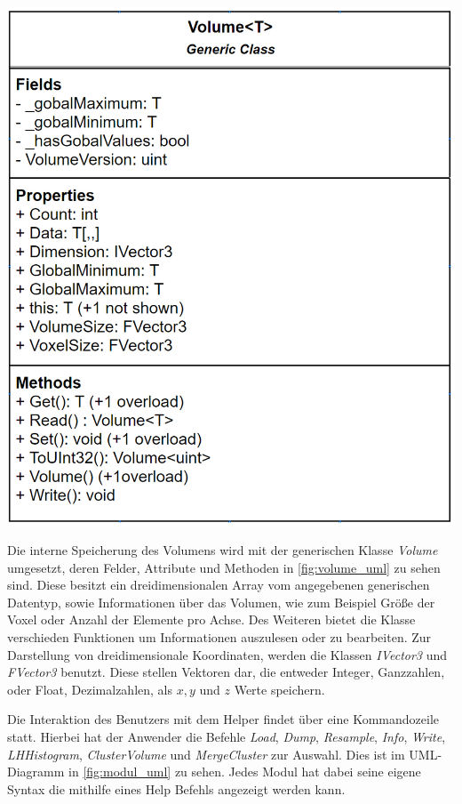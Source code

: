\begin{minipage}[H]{0.60\textwidth}
\includegraphics[width=\textwidth]{Logos/Volume_UML.PNG}
\label{fig:volume_uml} 
\end{minipage}
\begin{minipage}{0.39\textwidth}
Die interne Speicherung des Volumens wird mit der generischen Klasse \textit{Volume} umgesetzt, deren Felder, Attribute und Methoden in \autoref{fig:volume_uml} zu sehen sind. Diese besitzt ein dreidimensionalen Array vom angegebenen generischen Datentyp, sowie Informationen über das Volumen, wie zum Beispiel Größe der Voxel oder Anzahl der Elemente pro Achse. Des Weiteren bietet die Klasse verschieden Funktionen um Informationen auszulesen oder zu bearbeiten. Zur Darstellung von dreidimensionale Koordinaten, werden die Klassen \textit{IVector3} und \textit{FVector3} benutzt. Diese stellen Vektoren dar, die entweder Integer, Ganzzahlen, oder Float, Dezimalzahlen, als $x,y$ und $z$ Werte speichern.
\end{minipage}


Die Interaktion des Benutzers mit dem Helper findet über eine Kommandozeile statt. Hierbei hat der Anwender die Befehle \textit{Load}, \textit{Dump}, \textit{Resample}, \textit{Info}, \textit{Write}, \textit{LHHistogram}, \textit{ClusterVolume} und \textit{MergeCluster} zur Auswahl. Dies ist im UML-Diagramm in \autoref{fig:modul_uml} zu sehen. Jedes Modul hat dabei seine eigene Syntax die mithilfe eines Help Befehls angezeigt werden kann.


